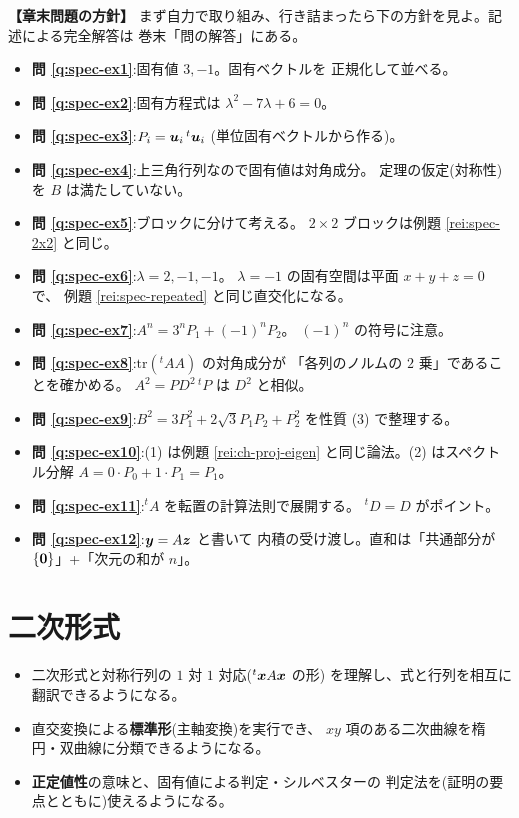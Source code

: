 \bigskip
{\small
\noindent\textbf{【章末問題の方針】}\quad
まず自力で取り組み、行き詰まったら下の方針を見よ。記述による完全解答は
巻末「問の解答」にある。
\begin{itemize}
\item \textbf{問 \ref{q:spec-ex1}}:固有値 $3, -1$。固有ベクトルを
正規化して並べる。
\item \textbf{問 \ref{q:spec-ex2}}:固有方程式は
$\lambda^2 - 7\lambda + 6 = 0$。
\item \textbf{問 \ref{q:spec-ex3}}:$P_i = \bm{u}_i\,{}^t\bm{u}_i$
(単位固有ベクトルから作る)。
\item \textbf{問 \ref{q:spec-ex4}}:上三角行列なので固有値は対角成分。
定理の仮定(対称性)を $B$ は満たしていない。
\item \textbf{問 \ref{q:spec-ex5}}:ブロックに分けて考える。
$2 \times 2$ ブロックは例題 \ref{rei:spec-2x2} と同じ。
\item \textbf{問 \ref{q:spec-ex6}}:$\lambda = 2, -1, -1$。
$\lambda = -1$ の固有空間は平面 $x + y + z = 0$ で、
例題 \ref{rei:spec-repeated} と同じ直交化になる。
\item \textbf{問 \ref{q:spec-ex7}}:$A^n = 3^nP_1 + (-1)^nP_2$。
$(-1)^n$ の符号に注意。
\item \textbf{問 \ref{q:spec-ex8}}:$\mathrm{tr}({}^t\!AA)$ の対角成分が
「各列のノルムの $2$ 乗」であることを確かめる。
$A^2 = PD^2\,{}^t\!P$ は $D^2$ と相似。
\item \textbf{問 \ref{q:spec-ex9}}:$B^2 = 3P_1^2 + 2\sqrt{3}P_1P_2 + P_2^2$
を性質 (3) で整理する。
\item \textbf{問 \ref{q:spec-ex10}}:(1) は例題 \ref{rei:ch-proj-eigen}
と同じ論法。(2) はスペクトル分解 $A = 0 \cdot P_0 + 1 \cdot P_1 = P_1$。
\item \textbf{問 \ref{q:spec-ex11}}:${}^t\!A$ を転置の計算法則で展開する。
${}^t\!D = D$ がポイント。
\item \textbf{問 \ref{q:spec-ex12}}:$\bm{y} = A\bm{z}$ と書いて
内積の受け渡し。直和は「共通部分が $\{\bm{0}\}$」+「次元の和が $n$」。
\end{itemize}
}

\chapter{二次形式}\label{chap:quadform}

\begin{goal}
\begin{itemize}
\item 二次形式と対称行列の $1$ 対 $1$ 対応(${}^t\bm{x}A\bm{x}$ の形)
を理解し、式と行列を相互に翻訳できるようになる。
\item 直交変換による\textbf{標準形}(主軸変換)を実行でき、
$xy$ 項のある二次曲線を楕円・双曲線に分類できるようになる。
\item \textbf{正定値性}の意味と、固有値による判定・シルベスターの
判定法を(証明の要点とともに)使えるようになる。
\end{itemize}
\end{goal}


